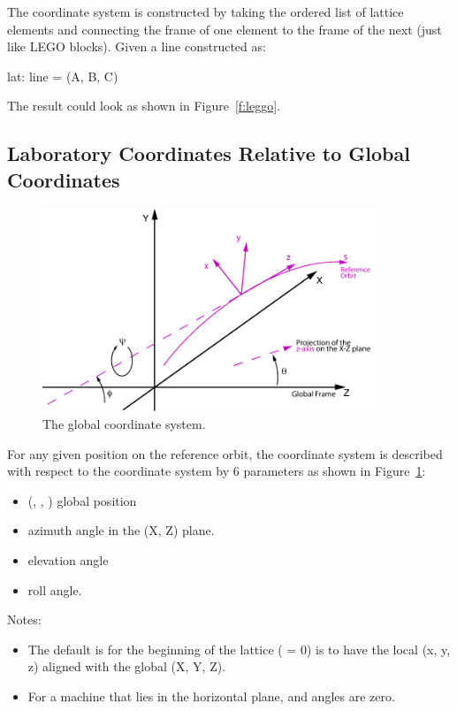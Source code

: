 \documentclass{hitec}
\begin{document}
The  coordinate system is constructed by taking the ordered list of lattice elements and
connecting the  frame of one element to the  frame of the next (just like LEGO
blocks). Given a line constructed as:
\begin{code}
    lat: line = (A, B, C)
\end{code}
The result could look as shown in Figure~\ref{f:leggo}.

\subsection{Laboratory Coordinates Relative to Global Coordinates}

\begin{figure}[tb]
  \centering
  \includegraphics[width=0.9\textwidth]{global-coords.pdf}
  \caption{The global coordinate system.}
  \label{f:global}
\end{figure}

For any given position on the reference orbit, the  coordinate system is described with
respect to the  coordinate system by 6 parameters as shown in Figure~\ref{f:global}:
\begin{itemize}
\item (, , ) global position
\item \vn{$\theta$} azimuth angle in the (X, Z) plane.
\item \vn{$\phi$} elevation angle
\item \vn{$\psi$} roll angle.
\end{itemize}

Notes:
\begin{itemize}
\item The default is for the beginning of the lattice ( = 0) is to have the local (x, y, z) aligned with the 
global (X, Y, Z).
\item For a machine that lies in the horizontal plane, \vn{$\phi$} and \vn{$\psi$} angles are zero.
\end{itemize}
\end{document}
